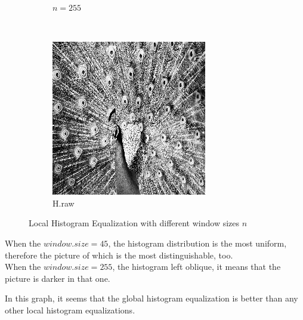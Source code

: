 \documentclass{article}
\begin{document}
\begin{enumerate}[label=(\alph*)]
\begin{figure}[!htb]
\begin{subfigure}[b]{0.3\textwidth}
            \caption{$n = 255$}
        \end{subfigure}
        ~
        \begin{subfigure}[b]{0.3\textwidth}
            \includegraphics[width=\textwidth]{img/H.png}
            \caption{H.raw}
        \end{subfigure}
        \caption{Local Histogram Equalization with different window sizes $n$}
        \label{Local Histogram Equalization with different window sizes $n$}

    \end{figure}    
    
    \newpage
    When the $window.size = 45$, the histogram distribution is the most uniform, therefore the picture of which is the most distinguishable, too. \\
    When the $window.size = 255$, the histogram left oblique, it means that the picture is darker in that one.

    In this graph, it seems that the global histogram equalization is better than any other local histogram equalizations.


\end{enumerate}
\end{document}
